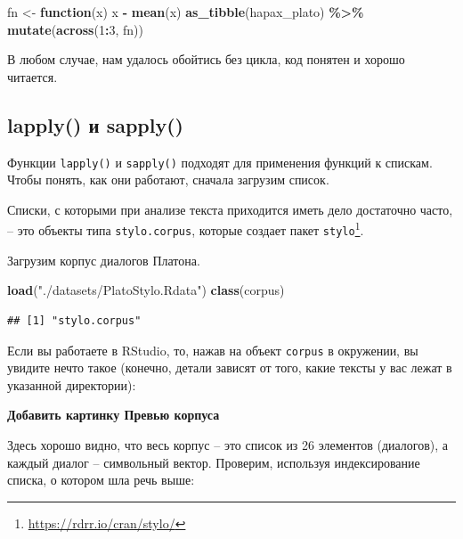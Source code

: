 \documentclass[
]{book}
\newenvironment{Shaded}{\begin{snugshade}}{\end{snugshade}}
\newcommand{\ControlFlowTok}[1]{\textcolor[rgb]{0.13,0.29,0.53}{\textbf{#1}}}
\newcommand{\DecValTok}[1]{\textcolor[rgb]{0.00,0.00,0.81}{#1}}
\newcommand{\FunctionTok}[1]{\textcolor[rgb]{0.13,0.29,0.53}{\textbf{#1}}}
\newcommand{\NormalTok}[1]{#1}
\newcommand{\OtherTok}[1]{\textcolor[rgb]{0.56,0.35,0.01}{#1}}
\newcommand{\SpecialCharTok}[1]{\textcolor[rgb]{0.81,0.36,0.00}{\textbf{#1}}}
\newcommand{\StringTok}[1]{\textcolor[rgb]{0.31,0.60,0.02}{#1}}
\theoremstyle{definition}
\theoremstyle{definition}
\theoremstyle{definition}
\theoremstyle{definition}
\theoremstyle{remark}
\begin{document}
\begin{Shaded}
\begin{Highlighting}[]
\NormalTok{fn }\OtherTok{\textless{}{-}} \ControlFlowTok{function}\NormalTok{(x) x }\SpecialCharTok{{-}} \FunctionTok{mean}\NormalTok{(x)}
\FunctionTok{as\_tibble}\NormalTok{(hapax\_plato) }\SpecialCharTok{\%\textgreater{}\%}
  \FunctionTok{mutate}\NormalTok{(}\FunctionTok{across}\NormalTok{(}\DecValTok{1}\SpecialCharTok{:}\DecValTok{3}\NormalTok{, fn))}
\end{Highlighting}
\end{Shaded}

В любом случае, нам удалось обойтись без цикла, код понятен и хорошо читается.

\hypertarget{lapply-ux438-sapply}{%
\subsection{lapply() и sapply()}\label{lapply-ux438-sapply}}

Функции \texttt{lapply()} и \texttt{sapply()} подходят для применения функций к спискам. Чтобы понять, как они работают, сначала загрузим список.

Списки, с которыми при анализе текста приходится иметь дело достаточно часто, -- это объекты типа \texttt{stylo.corpus}, которые создает пакет \texttt{stylo}\footnote{\url{https://rdrr.io/cran/stylo/}}.

Загрузим корпус диалогов Платона.

\begin{Shaded}
\begin{Highlighting}[]
\FunctionTok{load}\NormalTok{(}\StringTok{"./datasets/PlatoStylo.Rdata"}\NormalTok{)}
\FunctionTok{class}\NormalTok{(corpus)}
\end{Highlighting}
\end{Shaded}

\begin{verbatim}
## [1] "stylo.corpus"
\end{verbatim}

Если вы работаете в RStudio, то, нажав на объект \texttt{corpus} в окружении, вы увидите нечто такое (конечно, детали зависят от того, какие тексты у вас лежат в указанной директории):

\textbf{Добавить картинку Превью корпуса}

Здесь хорошо видно, что весь корпус -- это список из 26 элементов (диалогов), а каждый диалог -- символьный вектор. Проверим, используя индексирование списка, о котором шла речь выше:
\end{document}
